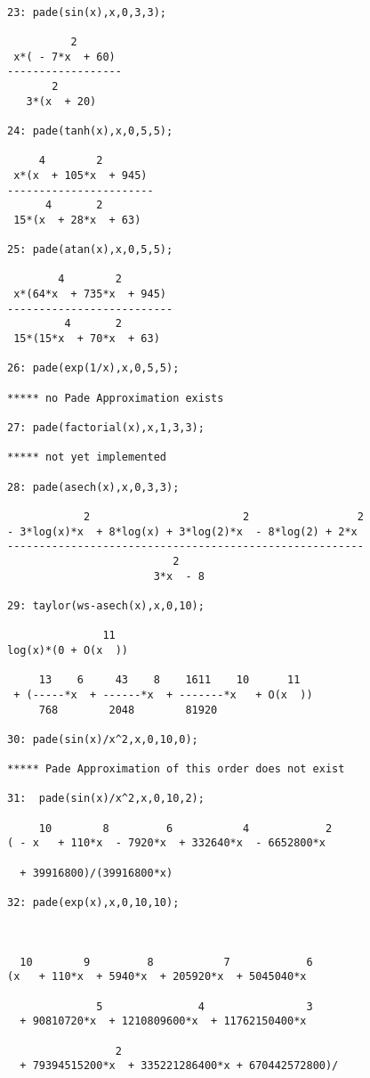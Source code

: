 \begin{verbatim}

23: pade(sin(x),x,0,3,3);

          2
 x*( - 7*x  + 60)
------------------
       2
   3*(x  + 20)

24: pade(tanh(x),x,0,5,5);

     4        2
 x*(x  + 105*x  + 945)
-----------------------
      4       2
 15*(x  + 28*x  + 63)

25: pade(atan(x),x,0,5,5);

        4        2
 x*(64*x  + 735*x  + 945)
--------------------------
         4       2
 15*(15*x  + 70*x  + 63)

26: pade(exp(1/x),x,0,5,5);

***** no Pade Approximation exists

27: pade(factorial(x),x,1,3,3);

***** not yet implemented

28: pade(asech(x),x,0,3,3);

            2                        2                 2
- 3*log(x)*x  + 8*log(x) + 3*log(2)*x  - 8*log(2) + 2*x
--------------------------------------------------------
                          2
                       3*x  - 8

29: taylor(ws-asech(x),x,0,10);

               11  
log(x)*(0 + O(x  ))

     13    6     43    8    1611    10      11
 + (-----*x  + ------*x  + -------*x   + O(x  ))
     768        2048        81920

30: pade(sin(x)/x^2,x,0,10,0);

***** Pade Approximation of this order does not exist

31:  pade(sin(x)/x^2,x,0,10,2);

     10        8         6           4            2
( - x   + 110*x  - 7920*x  + 332640*x  - 6652800*x

  + 39916800)/(39916800*x)

32: pade(exp(x),x,0,10,10);



  10        9         8           7            6
(x   + 110*x  + 5940*x  + 205920*x  + 5045040*x

              5               4                3
  + 90810720*x  + 1210809600*x  + 11762150400*x

                 2
  + 79394515200*x  + 335221286400*x + 670442572800)/


\end{verbatim}
